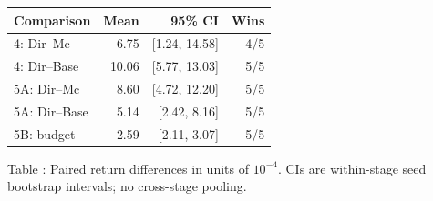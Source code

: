 \begin{center}\small
\begin{tabular}{lrrr}\toprule
Comparison & Mean & 95\% CI & Wins\\\midrule
4: Dir--Mc & 6.75 & [1.24, 14.58] & 4/5 \\
4: Dir--Base & 10.06 & [5.77, 13.03] & 5/5 \\
5A: Dir--Mc & 8.60 & [4.72, 12.20] & 5/5 \\
5A: Dir--Base & 5.14 & [2.42, 8.16] & 5/5 \\
5B: budget & 2.59 & [2.11, 3.07] & 5/5 \\
\bottomrule\end{tabular}
\label{tab:main}
\par\smallskip Table \thetable: Paired return differences in units of $10^{-4}$. CIs are within-stage seed bootstrap intervals; no cross-stage pooling.
\end{center}
